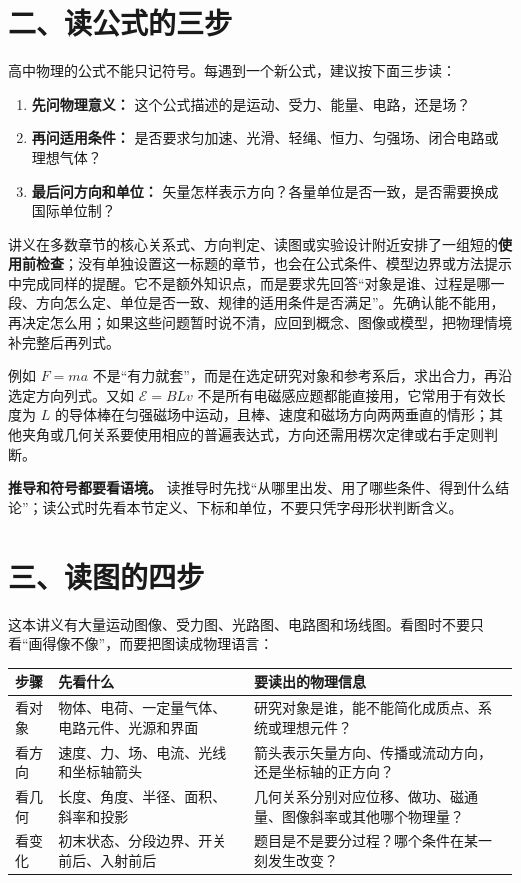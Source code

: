 \section*{二、读公式的三步}

高中物理的公式不能只记符号。每遇到一个新公式，建议按下面三步读：

\begin{enumerate}
  \item \textbf{先问物理意义：} 这个公式描述的是运动、受力、能量、电路，还是场？
  \item \textbf{再问适用条件：} 是否要求匀加速、光滑、轻绳、恒力、匀强场、闭合电路或理想气体？
  \item \textbf{最后问方向和单位：} 矢量怎样表示方向？各量单位是否一致，是否需要换成国际单位制？
\end{enumerate}

讲义在多数章节的核心关系式、方向判定、读图或实验设计附近安排了一组短的\textbf{使用前检查}；没有单独设置这一标题的章节，也会在公式条件、模型边界或方法提示中完成同样的提醒。它不是额外知识点，而是要求先回答“对象是谁、过程是哪一段、方向怎么定、单位是否一致、规律的适用条件是否满足”。先确认能不能用，再决定怎么用；如果这些问题暂时说不清，应回到概念、图像或模型，把物理情境补完整后再列式。

例如 $F=ma$ 不是“有力就套”，而是在选定研究对象和参考系后，求出合力，再沿选定方向列式。又如 $\mathcal{E}=BLv$ 不是所有电磁感应题都能直接用，它常用于有效长度为 $L$ 的导体棒在匀强磁场中运动，且棒、速度和磁场方向两两垂直的情形；其他夹角或几何关系要使用相应的普遍表达式，方向还需用楞次定律或右手定则判断。

\textbf{推导和符号都要看语境。} 读推导时先找“从哪里出发、用了哪些条件、得到什么结论”；读公式时先看本节定义、下标和单位，不要只凭字母形状判断含义。

\section*{三、读图的四步}

这本讲义有大量运动图像、受力图、光路图、电路图和场线图。看图时不要只看“画得像不像”，而要把图读成物理语言：

\begin{center}
\begin{tabular}{p{}p{}p{}}
\toprule
\textbf{步骤} & \textbf{先看什么} & \textbf{要读出的物理信息} \\
\midrule
看对象 & 物体、电荷、一定量气体、电路元件、光源和界面 & 研究对象是谁，能不能简化成质点、系统或理想元件？ \\
看方向 & 速度、力、场、电流、光线和坐标轴箭头 & 箭头表示矢量方向、传播或流动方向，还是坐标轴的正方向？ \\
看几何 & 长度、角度、半径、面积、斜率和投影 & 几何关系分别对应位移、做功、磁通量、图像斜率或其他哪个物理量？ \\
看变化 & 初末状态、分段边界、开关前后、入射前后 & 题目是不是要分过程？哪个条件在某一刻发生改变？ \\
\bottomrule
\end{tabular}
\end{center}

